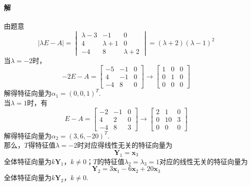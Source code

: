 \documentclass[12pt, a4paper, oneside, fontset=none]{ctexart}
\begin{document}
\paragraph*{解} 由题意
\[
    |\lambda E - A| = \begin{vmatrix}
        \lambda - 3 & -1          & 0           \\
        4           & \lambda + 1 & 0           \\
        -4          & 8           & \lambda + 2
    \end{vmatrix} = (\lambda + 2)(\lambda - 1)^2
\]
当$\lambda = -2$时，
\[
    -2E - A = \begin{bmatrix}
        -5 & -1 & 0 \\
        4  & -1 & 0 \\
        -4 & 8  & 0
    \end{bmatrix} \to \begin{bmatrix}
        1 & 0 & 0 \\
        0 & 1 & 0 \\
        0 & 0 & 0
    \end{bmatrix}
\]
解得特征向量为$\alpha_1 = (0,0,1)^T$. \\
当$\lambda = 1$时，有
\[
    E - A = \begin{bmatrix}
        -2 & -1 & 0 \\
        4  & 2  & 0 \\
        -4 & 8  & 3
    \end{bmatrix} \rightarrow \begin{bmatrix}
        2 & 1  & 0 \\
        0 & 10 & 3 \\
        0 & 0  & 0
    \end{bmatrix}
\]
解得特征向量为$\alpha_2 = (3,6,-20)^T$. \\
那么，$T$得特征值$\lambda = -2$时对应得线性无关的特征向量为
\[
    \bm{Y}_1 = \bm{x}_3
\]
全体特征向量为$k\bm{Y}_1，k\neq 0$；$T$的特征值$\lambda_2 = \lambda_3 = 1$对应的线性无关的特征向量为
\[
    \bm{Y}_2 = 3\bm{x}_1 - 6\bm{x}_2 + 20\bm{x}_3
\]
全体特征向量为$k\bm{Y}_2，k\neq 0.$
\end{document}
